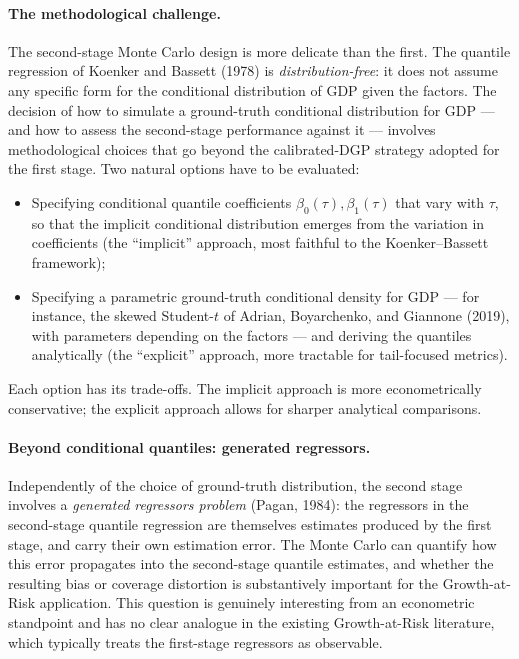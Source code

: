 \documentclass[11pt, a4paper, oneside]{article}
\begin{document}
\paragraph{The methodological challenge.}
The second-stage Monte Carlo design is more delicate than the first.
The quantile regression of Koenker and Bassett (1978) is
\emph{distribution-free}: it does not assume any specific form for
the conditional distribution of GDP given the factors. The decision
of how to simulate a ground-truth conditional distribution for GDP —
and how to assess the second-stage performance against it —
involves methodological choices that go beyond the calibrated-DGP
strategy adopted for the first stage. Two natural options have to
be evaluated:
\begin{itemize}[leftmargin=1.5em, itemsep=3pt]
    \item Specifying conditional quantile coefficients
          $\beta_0(\tau), \beta_1(\tau)$ that vary with $\tau$, so
          that the implicit conditional distribution emerges from
          the variation in coefficients (the ``implicit'' approach,
          most faithful to the Koenker--Bassett framework);
    \item Specifying a parametric ground-truth conditional density
          for GDP — for instance, the skewed Student-$t$ of Adrian,
          Boyarchenko, and Giannone (2019), with parameters
          depending on the factors — and deriving the quantiles
          analytically (the ``explicit'' approach, more tractable
          for tail-focused metrics).
\end{itemize}
Each option has its trade-offs. The implicit approach is more
econometrically conservative; the explicit approach allows for
sharper analytical comparisons.

\paragraph{Beyond conditional quantiles: generated regressors.}
Independently of the choice of ground-truth distribution, the
second stage involves a \emph{generated regressors problem}
(Pagan, 1984): the regressors in the second-stage quantile
regression are themselves estimates produced by the first stage,
and carry their own estimation error. The Monte Carlo can quantify
how this error propagates into the second-stage quantile estimates,
and whether the resulting bias or coverage distortion is
substantively important for the Growth-at-Risk application. This
question is genuinely interesting from an econometric standpoint
and has no clear analogue in the existing Growth-at-Risk literature,
which typically treats the first-stage regressors as observable.
\end{document}
